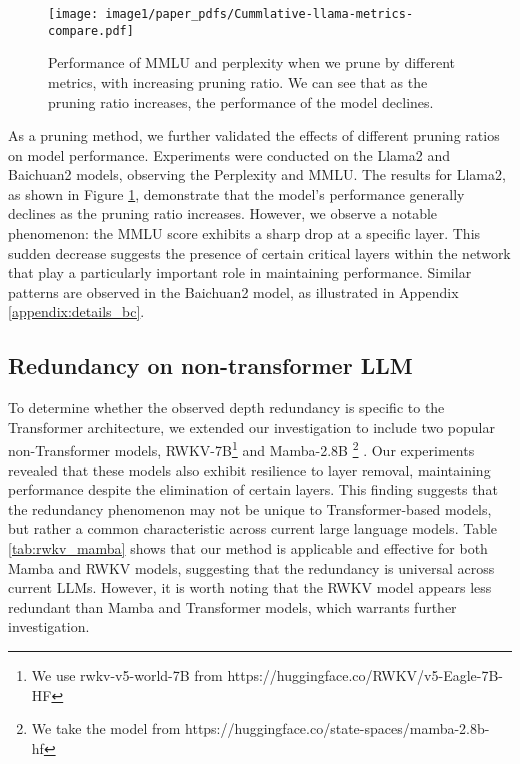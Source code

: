		\begin{figure}[t]
			\centering
			\texttt{[image: image1/paper\_pdfs/Cummlative-llama-metrics-compare.pdf]}
			\caption{\label{fig:cum-methods-compare} Performance of MMLU and perplexity when we prune by different metrics, with increasing pruning ratio. We can see that as the pruning ratio increases, the performance of the model declines.}
		\end{figure}
		As a pruning method, we further validated the effects of different pruning ratios on model performance. Experiments were conducted on the Llama2 and Baichuan2 models, observing the Perplexity and MMLU. The results for Llama2, as shown in Figure \ref{fig:cum-methods-compare}, demonstrate that the model's performance generally declines as the pruning ratio increases. However, we observe a notable phenomenon: the MMLU score exhibits a sharp drop at a specific layer. This sudden decrease suggests the presence of certain critical layers within the network that play a particularly important role in maintaining performance. Similar patterns are observed in the Baichuan2 model, as illustrated in Appendix \ref{appendix:details_bc}. 
		
		
		\subsection{Redundancy on non-transformer LLM}\label{sec:non-transformer}
		
		To determine whether the observed depth redundancy is specific to the Transformer architecture, we extended our investigation to include two popular non-Transformer models,  RWKV-7B\footnote{ We use rwkv-v5-world-7B from https://huggingface.co/RWKV/v5-Eagle-7B-HF} \citep{peng2023rwkv} and Mamba-2.8B  \footnote{We take the model from https://huggingface.co/state-spaces/mamba-2.8b-hf} \citep{gu2023mamba}. Our experiments revealed that these models also exhibit resilience to layer removal, maintaining performance despite the elimination of certain layers. This finding suggests that the redundancy phenomenon may not be unique to Transformer-based models, but rather a common characteristic across current large language models. Table \ref{tab:rwkv_mamba} shows that our method is applicable and effective for both Mamba and RWKV models, suggesting that the redundancy is universal across current LLMs. However, it is worth noting that the RWKV model appears less redundant than Mamba and Transformer models, which warrants further investigation.
		
